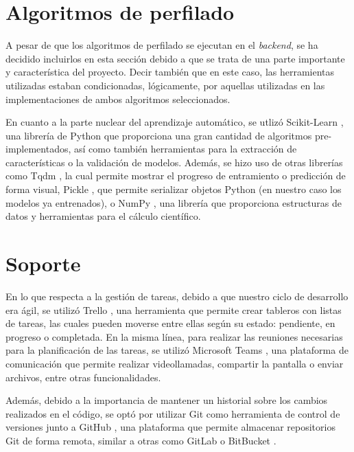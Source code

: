 \section{Algoritmos de perfilado}
\label{sec:herramientas_algoritmos}

A pesar de que los algoritmos de perfilado se ejecutan en el \textit{backend}, se ha decidido incluirlos en esta sección debido a que se trata de una parte
importante y característica del proyecto. Decir también que en este caso, las herramientas utilizadas estaban condicionadas, lógicamente,
por aquellas utilizadas en las implementaciones de ambos algoritmos seleccionados.

\bigskip
En cuanto a la parte nuclear del aprendizaje automático, se utlizó Scikit-Learn \cite{scikitlearn}, una librería de Python que proporciona una gran cantidad
de algoritmos pre-implementados, así como también herramientas para la extracción de características o la validación de modelos. Además, se hizo uso
de otras librerías como Tqdm \cite{tqdm}, la cual permite mostrar el progreso de entramiento o predicción de forma visual, Pickle \cite{pickle}, que permite
serializar objetos Python (en nuestro caso los modelos ya entrenados), o NumPy \cite{numpy}, una librería que proporciona estructuras de datos y herramientas para el cálculo científico.

\section{Soporte}
\label{sec:herramientas_soporte}

En lo que respecta a la gestión de tareas, debido a que nuestro ciclo de desarrollo era ágil, se utilizó Trello \cite{trello}, una herramienta que permite crear tableros con listas de tareas, las cuales pueden moverse
entre ellas según su estado: pendiente, en progreso o completada. En la misma línea, para realizar las reuniones necesarias para la planificación de las tareas, se utilizó Microsoft Teams \cite{teams}, una plataforma
de comunicación que permite realizar videollamadas, compartir la pantalla o enviar archivos, entre otras funcionalidades.

\bigskip
Además, debido a la importancia de mantener un historial sobre los cambios realizados en el código, se optó por utilizar Git \cite{git} como herramienta de control de versiones junto a GitHub \cite{github}, una plataforma que permite
almacenar repositorios Git de forma remota, similar a otras como GitLab \cite{gitlab} o BitBucket \cite{bitbucket}.

